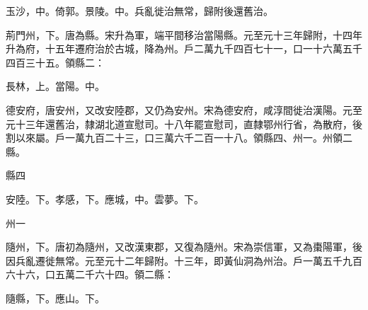 \begin{pinyinscope}
 玉沙，中。倚郭。景陵。中。兵亂徙治無常，歸附後還舊治。



 荊門州，下。唐為縣。宋升為軍，端平間移治當陽縣。元至元十三年歸附，十四年升為府，十五年遷府治於古城，降為州。戶二萬九千四百七十一，口一十六萬五千四百三十五。領縣二：



 長林，上。當陽。中。



 德安府，唐安州，又改安陸郡，又仍為安州。宋為德安府，咸淳間徙治漢陽。元至元十三年還舊治，隸湖北道宣慰司。十八年罷宣慰司，直隸鄂州行省，為散府，後割以來屬。戶一萬九百二十三，口三萬六千二百一十八。領縣四、州一。州領二縣。



 縣四



 安陸。下。孝感，下。應城，中。雲夢。下。



 州一



 隨州，下。唐初為隨州，又改漢東郡，又復為隨州。宋為崇信軍，又為棗陽軍，後因兵亂遷徙無常。元至元十二年歸附。十三年，即黃仙洞為州治。戶一萬五千九百六十六，口五萬二千六十四。領二縣：



 隨縣，下。應山。下。



\end{pinyinscope}